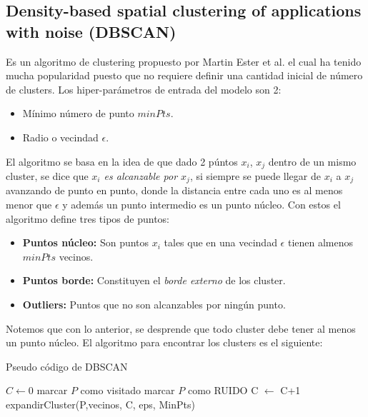\subsection{Density-based spatial clustering of applications with noise (DBSCAN)}

Es un algoritmo de clustering propuesto por Martin Ester et al. el cual ha tenido mucha popularidad puesto que no requiere definir una cantidad inicial de número de clusters. Los hiper-parámetros de entrada del modelo son 2:

\begin{itemize}
    \item Mínimo número de punto $minPts$.
    \item Radio o vecindad $\epsilon$.
\end{itemize}

El algoritmo se basa en la idea de que dado 2 púntos $x_i$, $x_j$ dentro de un mismo cluster, se dice que \emph{$x_i$ es alcanzable por $x_j$}, si siempre se puede llegar de $x_i$ a $x_j$ avanzando de punto en punto, donde la distancia entre cada uno es al menos menor que $\epsilon$ y además un punto intermedio es un punto núcleo. Con estos el algoritmo define tres tipos de puntos:

\begin{itemize}
    \item \textbf{Puntos núcleo:} Son puntos $x_i$ tales que en una vecindad $\epsilon$ tienen almenos $minPts$ vecinos.
    \item \textbf{Puntos borde:} Constituyen el \textit{borde externo} de los cluster.
    \item \textbf{Outliers:} Puntos que no son alcanzables por ningún punto.
\end{itemize}

Notemos que con lo anterior, se desprende que todo cluster debe tener al menos un punto núcleo.
El algoritmo para encontrar los clusters es el siguiente:


\begin{algorithm}[H]
  \caption{Pseudo código de DBSCAN
    \label{DBSCAN}}
  \begin{algorithmic}[1]
      \State $C \gets 0$\;
      \State marcar $P$ como visitado
        \State marcar $P$ como RUIDO
        \Else
        \State C $\gets$ C+1
        \State expandirCluster(P,vecinos, C, eps, MinPts)
        \EndIf
      \EndFor
    \EndFunction
  \end{algorithmic}
\end{algorithm}


